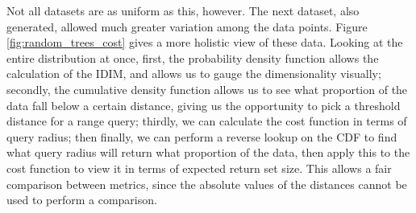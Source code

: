 Not all datasets are as uniform as this, however. The next dataset, also generated, allowed much greater variation among the data points.  Figure \ref{fig:random_trees_cost} gives a more holistic view of these data. Looking at the entire distribution at once, first, the probability density function allows the calculation of the IDIM, and allows us to gauge the dimensionality visually; secondly, the cumulative density function allows us to see what proportion of the data fall below a certain distance, giving us the opportunity to pick a threshold distance for a range query; thirdly, we can calculate the cost function in terms of query radius; then finally, we can perform a reverse lookup on the CDF to find what query radius will return what proportion of the data, then apply this to the cost function to view it in terms of expected return set size.  This allows a fair comparison between metrics, since the absolute values of the distances cannot be used to perform a comparison.




